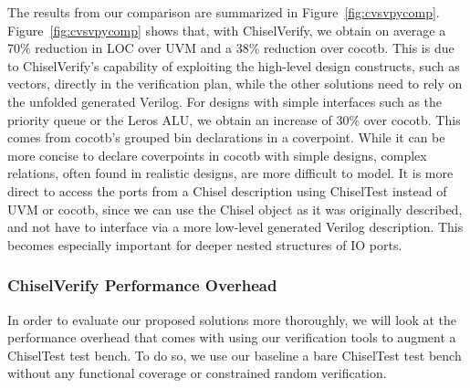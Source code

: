 \documentclass[conference]{IEEEtran}
\begin{document}
The results from our comparison are summarized in Figure~\ref{fig:cvsvpycomp}.
Figure~\ref{fig:cvsvpycomp} shows that, with ChiselVerify, we obtain on average a 70\% reduction in LOC over UVM and a 38\% reduction over cocotb. 
This is due to ChiselVerify's capability of exploiting the high-level design constructs, such as vectors, directly in the verification plan, while the other solutions need to rely on the unfolded generated Verilog.
For designs with simple interfaces such as the priority queue or the Leros ALU, we obtain an increase of 30\% over cocotb. 
This comes from cocotb's grouped bin declarations in a coverpoint.
While it can be more concise to declare coverpoints in cocotb with simple designs, complex relations, often found in realistic designs, are more difficult to model.
It is more direct to access the ports from a Chisel description using ChiselTest instead of UVM or cocotb, since we can use the Chisel object as it was originally described, and not have to interface via a more low-level generated Verilog description.
This becomes especially important for deeper nested structures of IO ports.

\subsubsection{ChiselVerify Performance Overhead}
In order to evaluate our proposed solutions more thoroughly, we will look at the performance overhead that comes with using our verification tools to augment a ChiselTest test bench.
To do so, we use our baseline a bare ChiselTest test bench without any functional coverage or constrained random verification.
\end{document}
